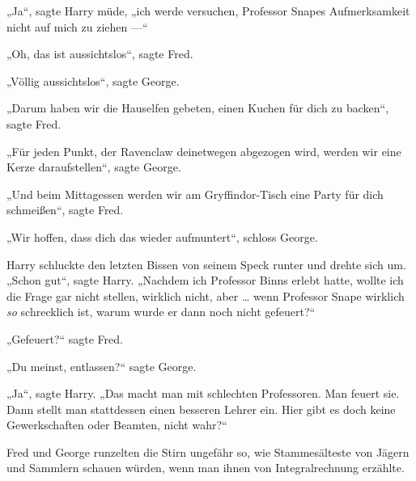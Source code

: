 „Ja“, sagte Harry müde, „ich werde versuchen, Professor Snapes Aufmerksamkeit nicht auf mich zu ziehen —“

„Oh, das ist aussichtslos“, sagte Fred.

„Völlig aussichtslos“, sagte George.

„Darum haben wir die Hauselfen gebeten, einen Kuchen für dich zu backen“, sagte Fred.

„Für jeden Punkt, der Ravenclaw deinetwegen abgezogen wird, werden wir eine Kerze daraufstellen“, sagte George.

„Und beim Mittagessen werden wir am Gryffindor-Tisch eine Party für dich schmeißen“, sagte Fred.

„Wir hoffen, dass dich das wieder aufmuntert“, schloss George.

Harry schluckte den letzten Bissen von seinem Speck runter und drehte sich um.
„Schon gut“, sagte Harry.
„Nachdem ich Professor Binns erlebt hatte, wollte ich die Frage gar nicht stellen, wirklich nicht, aber … wenn Professor Snape wirklich \emph{so} schrecklich ist, warum wurde er dann noch nicht gefeuert?“

„Gefeuert?“ sagte Fred.

„Du meinst, entlassen?“ sagte George.

„Ja“, sagte Harry.
„Das macht man mit schlechten Professoren. Man feuert sie. Dann stellt man stattdessen einen besseren Lehrer ein. Hier gibt es doch keine Gewerkschaften oder Beamten, nicht wahr?“

Fred und George runzelten die Stirn ungefähr so, wie Stammesälteste von Jägern und Sammlern schauen würden, wenn man ihnen von Integralrechnung erzählte.

